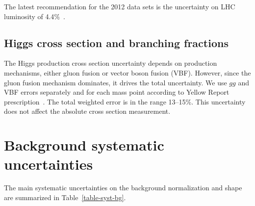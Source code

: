 The latest recommendation for the 2012 data sets is the uncertainty on LHC luminosity of 4.4$\%$~\cite{CMS-PAS-LUM-12-001}.

\subsection*{Higgs cross section and branching fractions}

The Higgs production cross section uncertainty depends on production mechanisms, either gluon fusion or vector boson fusion (VBF). However, since the gluon fusion mechanism dominates, it drives the total uncertainty.  We use $gg$ and VBF errors separately and for each mass point according to Yellow Report prescription~\cite{LHCHiggsCrossSectionWorkingGroup:2012ti}. The total weighted error is in the range 13--15\%. This uncertainty does not affect the absolute cross section measurement.

















\section{Background systematic uncertainties}

The main systematic uncertainties on the background normalization and shape are summarized in Table~\ref{table-syst-bg}.



